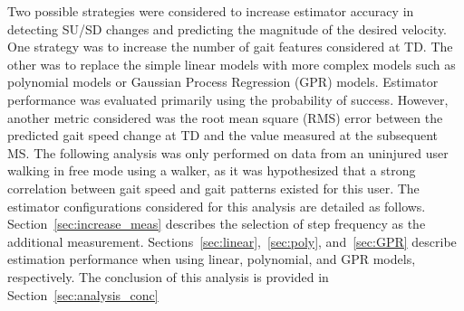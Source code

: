 Two possible strategies were considered to increase estimator accuracy in detecting SU/SD changes and predicting the magnitude of the desired velocity. One strategy was to increase the number of gait features considered at TD. The other was to replace the simple linear models with more complex models such as polynomial models or Gaussian Process Regression (GPR) models. Estimator performance was evaluated primarily using the probability of success. However, another metric considered was the root mean square (RMS) error between the predicted gait speed change at TD and the value measured at the subsequent MS. The following analysis was only performed on data from an uninjured user walking in free mode using a walker, as it was hypothesized that a strong correlation between gait speed and gait patterns existed for this user. The estimator configurations considered for this analysis are detailed as follows. Section~\ref{sec:increase_meas} describes the selection of step frequency as the additional measurement. Sections~\ref{sec:linear},~\ref{sec:poly}, and~\ref{sec:GPR} describe estimation performance when using linear, polynomial, and GPR models, respectively. The conclusion of this analysis is provided in Section~\ref{sec:analysis_conc}
%
%

